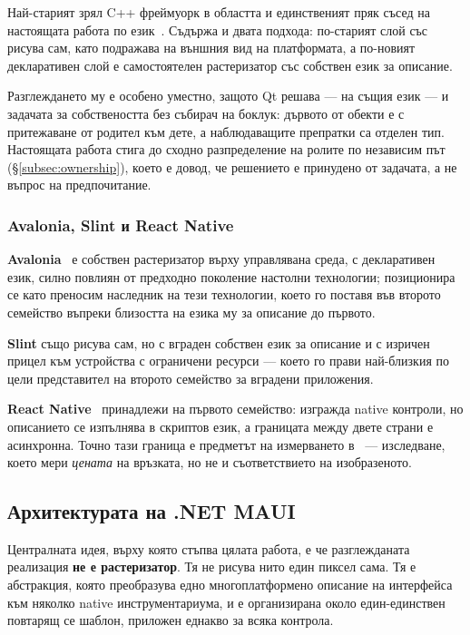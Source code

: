 Най-старият зрял C++ фреймуорк в областта и единственият пряк съсед на настоящата работа
по език~\cite{qt_docs}. Съдържа и двата подхода: по-старият слой със  рисува
сам, като подражава на външния вид на платформата, а по-новият декларативен слой е
самостоятелен растеризатор със собствен език за описание.

Разглеждането му е особено уместно, защото Qt решава --- на същия език --- и задачата за
собствеността без събирач на боклук: дървото от обекти е с притежаване от родител към
дете, а наблюдаващите препратки са отделен тип. Настоящата работа стига до сходно
разпределение на ролите по независим път (§\ref{subsec:ownership}), което е довод, че
решението е принудено от задачата, а не въпрос на предпочитание.

\subsubsection{Avalonia, Slint и React Native}

\textbf{Avalonia}~\cite{avalonia_docs} е собствен растеризатор върху управлявана среда, с
декларативен език, силно повлиян от предходно поколение настолни технологии; позиционира
се като преносим наследник на тези технологии, което го поставя във второто семейство
въпреки близостта на езика му за описание до първото.

\textbf{Slint} също рисува сам, но с вграден собствен език за описание и с изричен прицел
към устройства с ограничени ресурси --- което го прави най-близкия по цели представител на
второто семейство за вградени приложения.

\textbf{React Native}~\cite{reactnative_docs} принадлежи на първото семейство: изгражда
native контроли, но описанието се изпълнява в скриптов език, а границата между двете
страни е асинхронна. Точно тази граница е предметът на измерването
в~\cite{biornhansen2020overhead} --- изследване, което мери \emph{цената} на връзката, но
не и съответствието на изобразеното.

\subsection{Архитектурата на .NET MAUI}
\label{subsec:maui_arch}

Централната идея, върху която стъпва цялата работа, е че разглежданата реализация
\textbf{не е растеризатор}. Тя не рисува нито един пиксел сама. Тя е абстракция, която
преобразува едно многоплатформено описание на интерфейса към няколко native
инструментариума, и е организирана около един-единствен повтарящ се шаблон, приложен
еднакво за всяка контрола.

